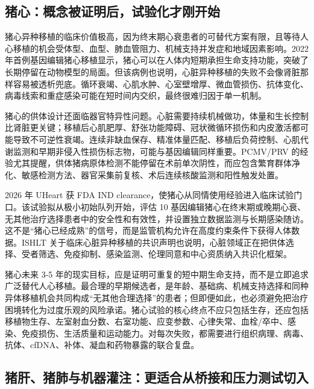 \documentclass[
  chinese,
  11pt,a4paper]{article}
\begin{document}
\subsection{猪心：概念被证明后，试验化才刚开始}\label{ux732aux5fc3ux6982ux5ff5ux88abux8bc1ux660eux540eux8bd5ux9a8cux5316ux624dux521aux5f00ux59cb}

猪心异种移植的临床价值极高，因为终末期心衰患者的可替代方案有限，且等待人心移植的机会受体型、血型、肺血管阻力、机械支持并发症和地域因素影响。2022
年首例基因编辑猪心移植显示，猪心可以在人体内短期承担生命支持功能，突破了长期停留在动物模型的局面\citep{griffith2022pigheartnejm}。但该病例也说明，心脏异种移植的失败不会像肾脏那样容易被透析兜底。循环衰竭、心肌水肿、心室壁增厚、微血管损伤、抗体变化、病毒线索和重症感染可能在短时间内交织，最终很难归因于单一机制。

猪心的供体设计还面临器官特异性问题。心脏需要持续机械做功，体量和生长控制比肾脏更关键；移植后心肌肥厚、舒张功能障碍、冠状微循环损伤和内皮激活都可能导致不可逆性衰竭。连续非缺血保存、精准体量匹配、移植后负荷控制、心肌代谢监测和早期非侵入性损伤标志物，可能与基因编辑同样重要\citep{2025statusof2025, geneticallyengineeredpig2025}。PCMV/PRV
的经验尤其提醒，供体猪病原体检测不能停留在术前单次阴性，而应包含繁育群体净化、敏感检测方法、器官采集前复核、术后连续核酸监测和阳性触发处置\citep{porcinecytomegalovirusin2022, comparisonofmethods2023}。

2026 年 UHeart 获 FDA IND
clearance，使猪心从同情使用经验进入临床试验门口。该试验拟从极小初始队列开始，评估
10
基因编辑猪心在终末期或晚期心衰、无其他治疗选择患者中的安全性和有效性，并设置独立数据监测与长期感染随访\citep{unitedtherapeutics2026uheartfda}。这不是``猪心已经成熟''的信号，而是监管机构允许在高度约束条件下获得人体数据。ISHLT
关于临床心脏异种移植的共识声明也说明，心脏领域正在把供体选择、受者筛选、免疫抑制、感染监测、伦理同意和中心资质纳入共识化框架\citep{the2026international2025}。

猪心未来 3-5
年的现实目标，应是证明可重复的短中期生命支持，而不是立即追求广泛替代人心移植。最合理的早期候选者，是年龄、基础病、机械支持选择和同种异体移植机会共同构成``无其他合理选择''的患者；但即便如此，也必须避免把治疗困境转化为过度乐观的风险承诺。猪心试验的核心终点不应只包括生存，还应包括移植物生存、左室射血分数、右室功能、应变参数、心律失常、血栓/卒中、感染、免疫损伤、生活质量和运动能力。对每次失败，都需要进行组织病理、病毒、抗体、cfDNA、补体、凝血和药物暴露的联合复盘。

\subsection{猪肝、猪肺与机器灌注：更适合从桥接和压力测试切入}\label{ux732aux809dux732aux80baux4e0eux673aux5668ux704cux6ce8ux66f4ux9002ux5408ux4eceux6865ux63a5ux548cux538bux529bux6d4bux8bd5ux5207ux5165}
\end{document}
